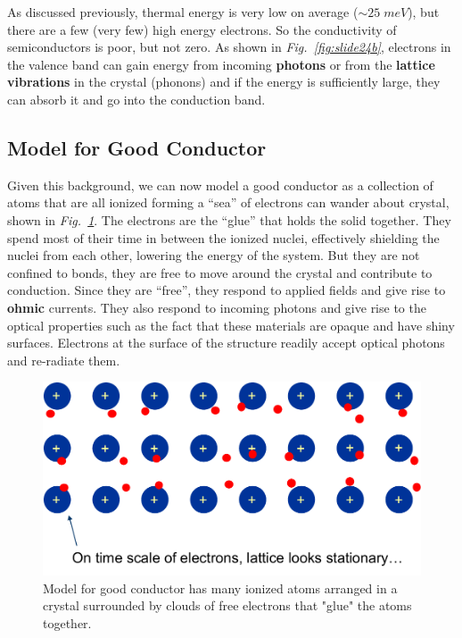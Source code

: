 As discussed previously, thermal energy is very low on average ($\sim 25\;meV$), but there are a few (very few) high energy electrons.  So the conductivity of semiconductors is poor, but not zero.  As shown in \emph{Fig.~\ref{fig:slide24b}}, electrons in the valence band can gain energy from incoming \textbf{photons} or from the \textbf{lattice vibrations} in the crystal (phonons) and if the energy is sufficiently large, they can absorb it and go into the conduction band.
\newpage
\subsection{Model for Good Conductor}
 Given this background, we can now model a good conductor as a collection of atoms that are all ionized forming a  “sea” of electrons can wander about crystal, shown in \emph{Fig.~\ref{fig:slide25}}.  The electrons are the “glue” that holds the solid together.  They spend most of their time in between the ionized nuclei, effectively shielding the nuclei from each other, lowering the energy of the system.  But they are not confined to bonds, they are free to move around the crystal and contribute to conduction.  Since they are “free”, they respond to applied fields and give rise to \textbf{ohmic} currents.  They also respond to incoming photons and give rise to the optical properties such as the fact that these materials are opaque and have shiny surfaces.  Electrons at the surface of the structure readily accept optical photons and re-radiate them.
\begin{figure}
\centering
\includegraphics[width=.6\columnwidth]{slide25}
\caption{Model for good conductor has many ionized atoms arranged in a crystal surrounded by clouds of free electrons that "glue" the atoms together.}
\label{fig:slide25}
\end{figure}
